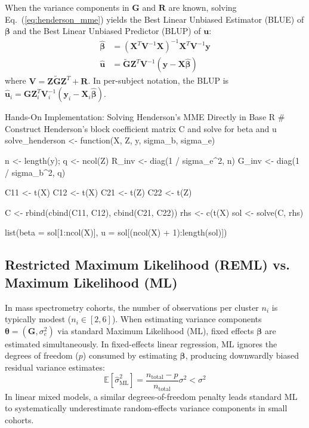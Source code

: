 \documentclass[11pt,twoside,openright]{book}
\begin{document}
When the variance components in $\mathbf{G}$ and $\mathbf{R}$ are known, solving Eq.~(\ref{eq:henderson_mme}) yields the Best Linear Unbiased Estimator (BLUE) of $\boldsymbol{\beta}$ and the Best Linear Unbiased Predictor (BLUP) of $\mathbf{u}$:
\begin{align}
\hat{\boldsymbol{\beta}} &= (\mathbf{X}^T \mathbf{V}^{-1} \mathbf{X})^{-1} \mathbf{X}^T \mathbf{V}^{-1} \mathbf{y} \label{eq:beta_gls} \\
\hat{\mathbf{u}} &= \widetilde{\mathbf{G}} \mathbf{Z}^T \mathbf{V}^{-1} (\mathbf{y} - \mathbf{X} \hat{\boldsymbol{\beta}}) \label{eq:u_blup}
\end{align}
where $\mathbf{V} = \mathbf{Z} \widetilde{\mathbf{G}} \mathbf{Z}^T + \mathbf{R}$. In per-subject notation, the BLUP is $\hat{\mathbf{u}}_i = \mathbf{G} \mathbf{Z}_i^T \mathbf{V}_i^{-1} (\mathbf{y}_i - \mathbf{X}_i \hat{\boldsymbol{\beta}})$.

\begin{rchunk}{Hands-On Implementation: Solving Henderson's MME Directly in Base R}
# Construct Henderson's block coefficient matrix C and solve for beta and u
solve_henderson <- function(X, Z, y, sigma_b, sigma_e) {
  n <- length(y); q <- ncol(Z)
  R_inv <- diag(1 / sigma_e^2, n)
  G_inv <- diag(1 / sigma_b^2, q)
  
  C11 <- t(X) %
  C12 <- t(X) %
  C21 <- t(Z) %
  C22 <- t(Z) %
  
  C   <- rbind(cbind(C11, C12), cbind(C21, C22))
  rhs <- c(t(X) %
  sol <- solve(C, rhs)
  
  list(beta = sol[1:ncol(X)], u = sol[(ncol(X) + 1):length(sol)])
}
\end{rchunk}

\subsection{Restricted Maximum Likelihood (REML) vs. Maximum Likelihood (ML)}

In mass spectrometry cohorts, the number of observations per cluster $n_i$ is typically modest ($n_i \in [2, 6]$). When estimating variance components $\boldsymbol{\theta} = (\mathbf{G}, \sigma_e^2)$ via standard Maximum Likelihood (ML), fixed effects $\boldsymbol{\beta}$ are estimated simultaneously. In fixed-effects linear regression, ML ignores the degrees of freedom ($p$) consumed by estimating $\boldsymbol{\beta}$, producing downwardly biased residual variance estimates:
\begin{equation}
\label{eq:ml_bias}
\mathbb{E}[\hat{\sigma}^2_{\text{ML}}] = \frac{n_{\text{total}} - p}{n_{\text{total}}} \sigma^2 < \sigma^2
\end{equation}
In linear mixed models, a similar degrees-of-freedom penalty leads standard ML to systematically underestimate random-effects variance components in small cohorts.
\end{document}
